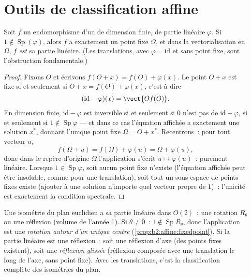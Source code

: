 \section{Outils de classification affine}

\begin{proposition}\label{prop:b2:affine:fixedpoint}
Soit $f$ un endomorphisme  d'un  de dimension
finie, de partie linéaire $\varphi$. Si $1 \notin
\operatorname{Sp}(\varphi)$, alors $f$ a exactement un point fixe
$\Omega$, et dans la vectorialisation en $\Omega$, $f$ \emph{est}
sa partie linéaire. (Les translations, avec $\varphi = \mathrm{id}$ et
sans point fixe, sont l'obstruction fondamentale.)
\end{proposition}

\begin{proof}
Fixons $O$ et écrivons $f(O + x) = f(O) + \varphi(x)$. Le point
$O + x$ est fixe si et seulement si $O + x = f(O) + \varphi(x)$,
c'est-à-dire
\[
(\mathrm{id} - \varphi)(x) = \vect{O f(O)} .
\]
En dimension finie, $\mathrm{id} - \varphi$ est inversible
si et seulement si $0$ n'est pas  de $\mathrm{id} -
\varphi$, si et seulement si $1 \notin \operatorname{Sp}\varphi$ ---
et dans ce cas l'équation affichée a exactement une solution $x^*$,
donnant l'unique point fixe $\Omega = O + x^*$. Recentrons~: pour tout
vecteur $u$,
\[
f(\Omega + u) = f(\Omega) + \varphi(u) = \Omega + \varphi(u),
\]
donc dans le repère d'origine $\Omega$ l'application s'écrit $u \mapsto
\varphi(u)$~: purement linéaire. Lorsque $1 \in
\operatorname{Sp}\varphi$, soit aucun point fixe n'existe (l'équation
affichée peut être insoluble, comme pour une translation), soit tout
un sous-espace  de points fixes existe (ajouter à une solution
n'importe quel vecteur propre de  $1$)~: l'unicité est
exactement la condition spectrale.
\end{proof}

\begin{example}\label{ex:b2:affine:isometries}
Une isométrie  du plan euclidien a sa partie linéaire dans
$O(2)$~: une rotation $R_\theta$ ou une réflexion (volume de l'année 1).
Si $\theta \neq 0$~: $1 \notin \operatorname{Sp} R_\theta$, donc
l'application est une \emph{rotation autour d'un unique centre}
(\cref{prop:b2:affine:fixedpoint}). Si la partie linéaire est une
réflexion~: soit une réflexion d'axe (des points fixes existent), soit
une \emph{réflexion glissée} (réflexion composée avec une translation
le long de l'axe, sans point fixe). Avec les translations, c'est la
classification complète des isométries du plan.
\end{example}

